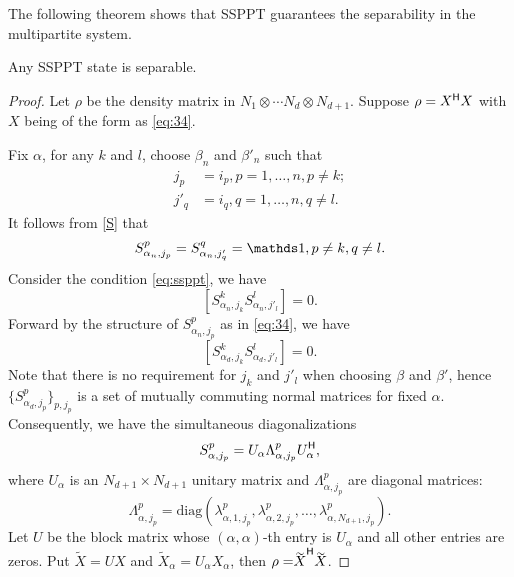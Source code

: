   The following theorem shows that SSPPT guarantees the separability in the  multipartite system.
  \begin{thm}
    Any SSPPT state is separable.
  \end{thm}
  \begin{proof}
    Let $\rho$ be the density matrix in $N_1\otimes \cdots N_d\otimes N_{d+1}$. 
    Suppose $\rho = X^{\mathsf{H}}X$ with $X$ being of  the form as  \cref{eq:34}.

    Fix $\alpha$,  for any $k$ and $l$, choose $\beta_n$ and $\beta'_n$ such that
    \begin{equation*}
      \begin{split}
        j_p &= i_p ,p=1,\ldots,n,p\neq k;\\
        j'_{q}& = i_{q}, q = 1,\ldots, n, q\neq l.
      \end{split}
    \end{equation*}
    It follows from \cref{S} that
    \begin{equation}
      \label{multiSPPTv0.6:eq:6}
      S_{\alpha_n,j_p}^{p}= S_{\alpha_n,j'_q}^{q} = \I, p\neq k,q\neq l.
    \end{equation}
     Consider the condition \eqref{eq:ssppt}, we have
    \begin{equation}
      \label{multiSPPTv0.6:eq:7}
\left[         S^k_{\alpha_n,j_k} S^l_{\alpha_n,j'_l} \right] =0.
\end{equation}
Forward by the structure of $S_{\alpha_n,j_p}^p$ as in \cref{eq:34}, we have
\begin{equation}
  \label{multiSPPTv0.6:eq:8}
  \left[         S^k_{\alpha_{d},j_k} S^l_{\alpha_{d},j'_l} \right] =0.
\end{equation}
Note that there is no requirement for $j_k$ and $j'_l$ when choosing $\beta$ and $\beta'$, hence $\{S_{\alpha_{d},j_p}^p\}_{p,j_p}$  is a set of mutually commuting normal  matrices for fixed $\alpha$.
Consequently,  we have the simultaneous diagonalizations
    \begin{equation*}
      S^p_{\alpha,j_p} =  U_{\alpha} \Lambda^p_{\alpha,j_p}U^{\mathsf{H}}_{\alpha},
    \end{equation*}
    where $U_{\alpha}$ is an $N_{d+1}\times N_{d+1}$ unitary matrix and $\Lambda^p_{\alpha,j_p}$ are diagonal matrices:
    \begin{equation*}
      \Lambda_{\alpha,j_p}^p = \mathrm{diag} (\lambda_{\alpha,1,j_p}^p,\lambda_{\alpha,2,j_p}^p,\ldots,\lambda_{\alpha,N_{d+1},j_p}^p).
    \end{equation*}
    Let $U$ be the  block matrix whose $(\alpha,\alpha)$-th entry is $U_{\alpha}$ and all other entries are zeros. Put
    $\tilde X = U X$ and $\tilde X_{\alpha} = U_{\alpha}X_{\alpha}$, then $\rho = \adj{\tilde X }\tilde X$.


\end{proof}
